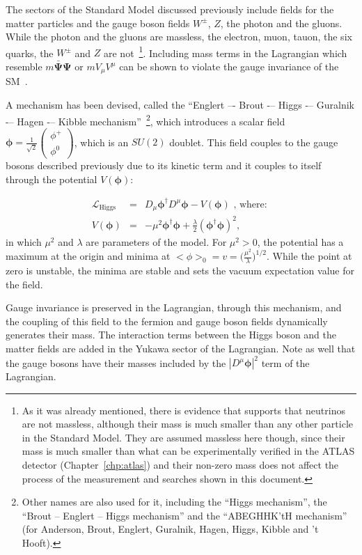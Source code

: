 The sectors of the Standard Model discussed previously include fields for the matter particles and the gauge boson fields $W^{\pm}$, $Z$, the photon and the gluons.
While the photon and the gluons are massless, the electron, muon, tauon, the six quarks, the $W^{\pm}$ and $Z$ are not~\footnote{As it was already
mentioned, there is evidence that supports that neutrinos
are not massless, although their mass is much smaller than any other particle in the Standard Model. They are assumed massless here though, since their mass is much smaller
than what can be experimentally verified in the ATLAS detector (Chapter~\ref{chp:atlas}) and their non-zero mass does not affect the process of the measurement and searches
shown in this document.}. Including mass terms in the Lagrangian which resemble $m\bar{\mathbf{\Psi}}\mathbf{\Psi}$ or $m V_\mu V^\mu$ can be
shown to violate the gauge invariance of the
SM~\cite{qft}.

A mechanism has been devised, called the ``Englert –- Brout -– Higgs -– Guralnik -– Hagen -– Kibble mechanism''~\footnote{Other
names are also used for it, including the ``Higgs mechanism'',
the ``Brout -- Englert -- Higgs mechanism'' and the ``ABEGHHK'tH mechanism'' (for Anderson, Brout, Englert, Guralnik, Hagen, Higgs, Kibble and 't Hooft).}, which introduces
a scalar field~\cite{qft} $\mathbf{\phi} = \frac{1}{\sqrt{2}} \begin{pmatrix} \phi^+ \\ \phi^0 \end{pmatrix}$, which is an $SU(2)$ doublet. This field couples to the gauge bosons described
previously due to its kinetic term and it couples to itself through the potential $V(\mathbf{\phi})$:

\begin{eqnarray}
\mathcal{L}_\textrm{Higgs}&=&D_\mu\mathbf{\phi}^\dagger D^\mu\mathbf{\phi} - V(\mathbf{\phi}) \textrm{ , where: } \\
V(\mathbf{\phi})&=&-\mu^2\mathbf{\phi}^\dagger \mathbf{\phi} + \frac{\lambda}{2} (\mathbf{\phi}^\dagger \mathbf{\phi})^2,
\label{eq:higgs}
\end{eqnarray}
in which $\mu^2$ and $\lambda$ are parameters of the model. For $\mu^2 > 0$, the potential has a maximum at the origin
and minima at $<\phi>_0 = v = \Big(\frac{\mu^2}{\lambda}\Big)^{1/2}$.
While the point at zero is unstable, the minima are stable and sets the vacuum expectation
value for the field.

Gauge invariance is preserved in the Lagrangian, through this mechanism, and
the coupling of this field to the fermion and gauge boson fields dynamically generates their mass.
The interaction terms between the Higgs boson and the matter fields are added in the Yukawa sector of the Lagrangian.
Note as well that the gauge bosons have their masses included by the $|D^\mu\mathbf{\phi}|^2$ term of the Lagrangian.

